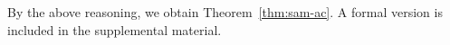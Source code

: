 \documentclass[letterpaper]{article} %
\begin{document}
\noindent
By the above reasoning, we obtain Theorem~\ref{thm:sam-ac}. 
A formal version is included in the supplemental material.


\end{document}
